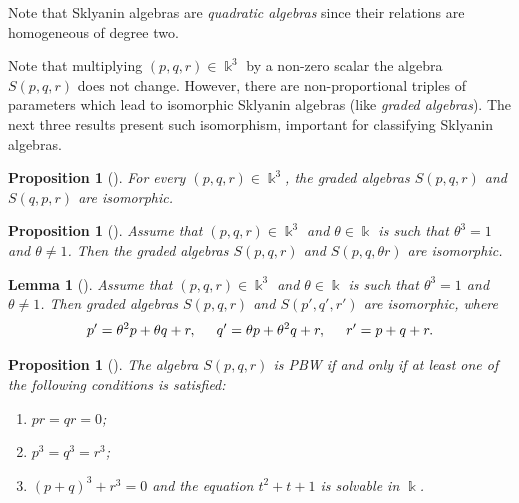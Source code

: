 \documentclass{amsart}
\newtheorem{lemma}[theorem]{Lemma}
\newtheorem{proposition}[theorem]{Proposition}
\theoremstyle{definition}
\theoremstyle{remark}
\numberwithin{equation}{section}
\begin{document}
Note that Sklyanin algebras are \textit{quadratic algebras} since their relations are homogeneous of degree two.

Note that multiplying $(p,q,r) \in  \Bbbk^3$ by a non-zero scalar the algebra $S(p,q,r)$ does not change. However, there are non-proportional triples of parameters which lead to isomorphic Sklyanin algebras (like {\em graded algebras}). The next three results present such isomorphism, important for classifying Sklyanin algebras.

\begin{proposition}[{\cite[Lemma 3.1]{IyuduShkarin2017}}]\label{lemma3.1}   
For every $(p,q,r)\in  \Bbbk^3$, the graded algebras $S(p,q,r)$ and $S(q,p, r)$ are isomorphic. 
\end{proposition}

\begin{proposition}[{\cite[Lemma 3.2]{IyuduShkarin2017}}]\label{lemma3.2} 
Assume that $(p,q,r)\in  \Bbbk^3$ and $\theta \in \Bbbk$ is such that $\theta^3=1$ and $\theta\neq 1$. Then the graded algebras $S(p,q,r)$ and $S(p,q,\theta r)$ are isomorphic. 
\end{proposition}

\begin{lemma}[{\cite[Lemma 3.3]{IyuduShkarin2017}}] \label{lemma3.3}
Assume that $(p,q,r)\in \Bbbk^3$ and $\theta \in \Bbbk$ is such that $\theta^3=1$ and $\theta\neq 1$. Then graded algebras $S(p,q,r)$ and $S(p',q', r')$ are isomorphic, where
\begin{equation*}
    p'=\theta^2p+\theta q+r, \hspace{0.5cm} q'=\theta p+\theta^2q+r, \hspace{0.5cm} r'=p+q+r.
\end{equation*}
\end{lemma}

\begin{proposition}[{\cite[Theorem 1.2]{IyuduShkarin2017}}] \label{Theorem1.2}
    The algebra $S(p, q, r)$ is PBW if and only if at least one of the following conditions is satisfied:
    \begin{enumerate}
        \item [\rm (1)] $pr = qr = 0$;
        \item [\rm (2)] $p^3 = q^3 = r^3$;
        \item [\rm (3)] $(p + q)^3 + r^3 = 0$ and the equation $t^2 + t + 1$ is solvable in $\Bbbk$.
    \end{enumerate}
\end{proposition}
\end{document}
